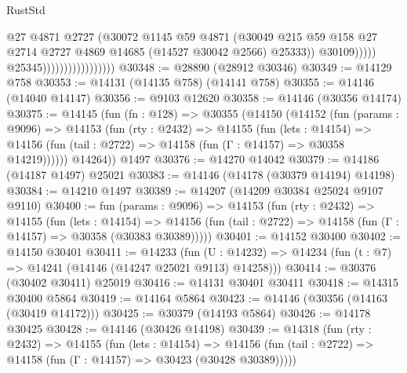 \begin{lexlean}{RustStd}
\begin{coremodule}
                                                @27
                                                @4871
                                                @2727
                                                (@30072
                                                  @1145
                                                  @59
                                                  @4871
                                                  (@30049
                                                    @215
                                                    @59
                                                    @158
                                                    @27
                                                    @2714
                                                    @2727
                                                    @4869
                                                    @14685
                                                    (@14527 @30042 @2566)
                                                    @25333))
                                                @30109)))))
                                      @25345)))))))))))))))))
@30348 := @28890 (@28912 @30346)
@30349 := @14129 @758
@30353 := @14131 (@14135 @758) (@14141 @758)
@30355 := @14146 (@14040 @14147)
@30356 := @9103 @12620
@30358 := @14146 (@30356 @14174)
@30375 := @14145
    (fun (fn : @128) =>
    @30355
      (@14150
        (@14152
          (fun (params : @9096) =>
          @14153
            (fun (rty : @2432) =>
            @14155
              (fun (lets : @14154) =>
              @14156 (fun (tail : @2722) => @14158 (fun (Γ : @14157) => @30358 @14219))))))
        @14264))
    @1497
@30376 := @14270 @14042
@30379 := @14186 (@14187 @1497) @25021
@30383 := @14146 (@14178 (@30379 @14194) @14198)
@30384 := @14210 @1497
@30389 := @14207 (@14209 @30384 @25024 @9107 @9110)
@30400 := fun (params : @9096) =>
  @14153
    (fun (rty : @2432) =>
    @14155
      (fun (lets : @14154) =>
      @14156 (fun (tail : @2722) => @14158 (fun (Γ : @14157) => @30358 (@30383 @30389)))))
@30401 := @14152 @30400
@30402 := @14150 @30401
@30411 := @14233
    (fun (U : @14232) => @14234 (fun (t : @7) => @14241 (@14146 (@14247 @25021 @9113) @14258)))
@30414 := @30376 (@30402 @30411) @25019
@30416 := @14131 @30401 @30411
@30418 := @14315 @30400 @5864
@30419 := @14164 @5864
@30423 := @14146 (@30356 (@14163 (@30419 @14172)))
@30425 := @30379 (@14193 @5864)
@30426 := @14178 @30425
@30428 := @14146 (@30426 @14198)
@30439 := @14318
    (fun (rty : @2432) =>
    @14155
      (fun (lets : @14154) =>
      @14156 (fun (tail : @2722) => @14158 (fun (Γ : @14157) => @30423 (@30428 @30389)))))

\end{coremodule}
\end{lexlean}
